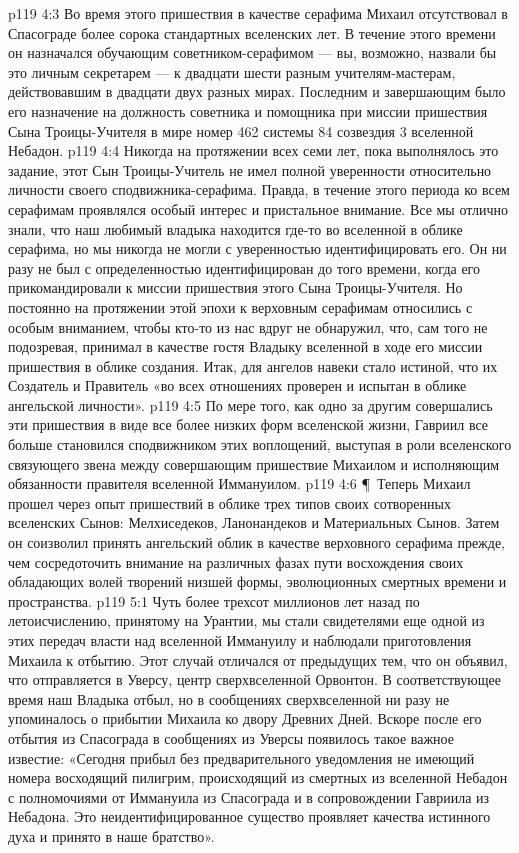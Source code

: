 \vs p119 4:3 Во время этого пришествия в качестве серафима Михаил отсутствовал в Спасограде более сорока стандартных вселенских лет. В течение этого времени он назначался обучающим советником\hyp{}серафимом --- вы, возможно, назвали бы это личным секретарем --- к двадцати шести разным учителям\hyp{}мастерам, действовавшим в двадцати двух разных мирах. Последним и завершающим было его назначение на должность советника и помощника при миссии пришествия Сына Троицы\hyp{}Учителя в мире номер 462 системы 84 созвездия 3 вселенной Небадон.
\vs p119 4:4 Никогда на протяжении всех семи лет, пока выполнялось это задание, этот Сын Троицы\hyp{}Учитель не имел полной уверенности относительно личности своего сподвижника\hyp{}серафима. Правда, в течение этого периода ко всем серафимам проявлялся особый интерес и пристальное внимание. Все мы отлично знали, что наш любимый владыка находится где\hyp{}то во вселенной в облике серафима, но мы никогда не могли с уверенностью идентифицировать его. Он ни разу не был с определенностью идентифицирован до того времени, когда его прикомандировали к миссии пришествия этого Сына Троицы\hyp{}Учителя. Но постоянно на протяжении этой эпохи к верховным серафимам относились с особым вниманием, чтобы кто\hyp{}то из нас вдруг не обнаружил, что, сам того не подозревая, принимал в качестве гостя Владыку вселенной в ходе его миссии пришествия в облике создания. Итак, для ангелов навеки стало истиной, что их Создатель и Правитель «во всех отношениях проверен и испытан в облике ангельской личности».
\vs p119 4:5 По мере того, как одно за другим совершались эти пришествия в виде все более низких форм вселенской жизни, Гавриил все больше становился сподвижником этих воплощений, выступая в роли вселенского связующего звена между совершающим пришествие Михаилом и исполняющим обязанности правителя вселенной Иммануилом.
\vs p119 4:6 \P\ Теперь Михаил прошел через опыт пришествий в облике трех типов своих сотворенных вселенских Сынов: Мелхиседеков, Ланонандеков и Материальных Сынов. Затем он соизволил принять ангельский облик в качестве верховного серафима прежде, чем сосредоточить внимание на различных фазах пути восхождения своих обладающих волей творений низшей формы, эволюционных смертных времени и пространства.
\vs p119 5:1 Чуть более трехсот миллионов лет назад по летоисчислению, принятому на Урантии, мы стали свидетелями еще одной из этих передач власти над вселенной Иммануилу и наблюдали приготовления Михаила к отбытию. Этот случай отличался от предыдущих тем, что он объявил, что отправляется в Уверсу, центр сверхвселенной Орвонтон. В соответствующее время наш Владыка отбыл, но в сообщениях сверхвселенной ни разу не упоминалось о прибытии Михаила ко двору Древних Дней. Вскоре после его отбытия из Спасограда в сообщениях из Уверсы появилось такое важное известие: «Сегодня прибыл без предварительного уведомления не имеющий номера восходящий пилигрим, происходящий из смертных из вселенной Небадон с полномочиями от Иммануила из Спасограда и в сопровождении Гавриила из Небадона. Это неидентифицированное существо проявляет качества истинного духа и принято в наше братство».
